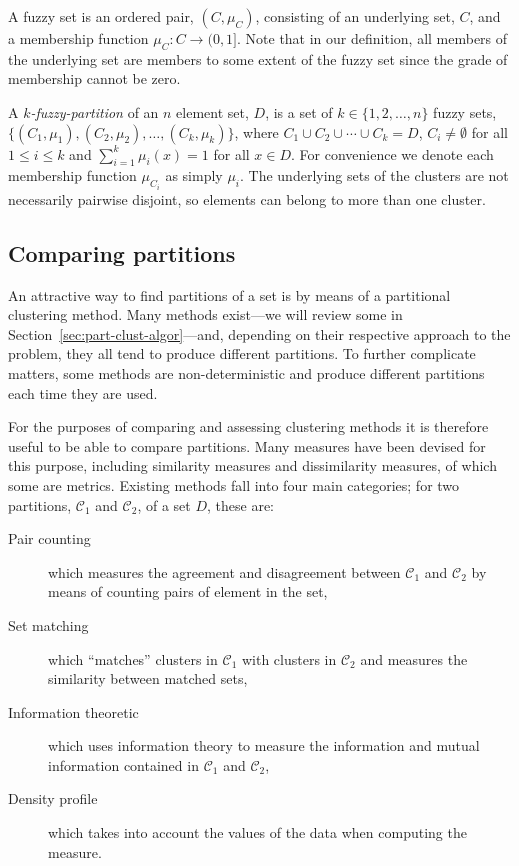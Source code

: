 \documentclass[a4paper]{report}
\newcommand{\dset}{D}
\newcommand{\clus}{\mathcal{C}}
\begin{document}
A fuzzy set is an ordered pair, $(C,\mu_{C})$, consisting of an underlying
set, $C$, and a membership function $\mu_{C} \colon C \to (0,1]$.  Note that
in our definition, all members of the underlying set are members to some
extent of the fuzzy set since the grade of membership cannot be zero.

A \textit{$k$-fuzzy-partition} of an $n$ element set, $\dset$, is a set of $k
\in \{1,2,\dotsc,n\}$ fuzzy sets,
$\{(C_1,\mu_1),(C_2,\mu_2),\dotsc,(C_k,\mu_k)\}$, where $C_1 \cup C_2 \cup
\dotsb \cup C_k = \dset$, $C_i \neq \emptyset$ for all $1 \leq i \leq k$ and
$\sum_{i=1}^{k} \mu_i(x) = 1$ for all $x \in \dset$.  For convenience we
denote each membership function $\mu_{C_i}$ as simply $\mu_i$.  The underlying
sets of the clusters are not necessarily pairwise disjoint, so elements can
belong to more than one cluster.

\subsection{Comparing partitions}
\label{sec:comparing-partitions}

An attractive way to find partitions of a set is by means of a partitional
clustering method.  Many methods exist---we will review some in
Section~\ref{sec:part-clust-algor}---and, depending on their respective
approach to the problem, they all tend to produce different partitions.  To
further complicate matters, some methods are non-deterministic and produce
different partitions each time they are used.

For the purposes of comparing and assessing clustering methods it is therefore
useful to be able to compare partitions.  Many measures have been devised for
this purpose, including similarity measures and dissimilarity measures, of
which some are metrics.  Existing methods fall into four main categories; for
two partitions, $\clus_1$ and $\clus_2$, of a set $\dset$, these are:
\begin{description}
\item[Pair counting] which measures the agreement and disagreement between
  $\clus_1$ and $\clus_2$ by means of counting pairs of element in the set,
\item[Set matching] which ``matches'' clusters in $\clus_1$ with clusters in
  $\clus_2$ and measures the similarity between matched sets,
\item[Information theoretic] which uses information theory to measure the
  information and mutual information contained in $\clus_1$ and $\clus_2$,
\item[Density profile] which takes into account the values of the data when
  computing the measure.
\end{description}
\end{document}
